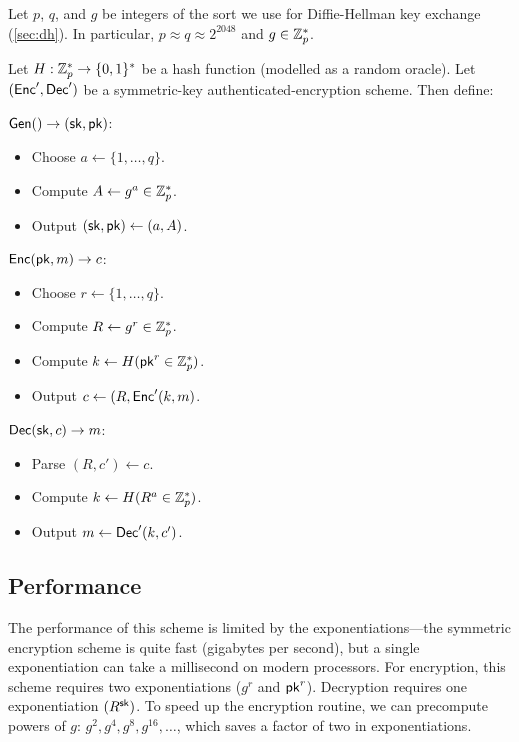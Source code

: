 \begin{definition}
Let $p$, $q$, and $g$ be integers of the sort we use for Diffie-Hellman
key exchange (\cref{sec:dh}).
In particular, $p \approx q \approx 2^{2048}$
and $g \in \mathbb{Z}^*_p$.

Let $H: \mathbb{Z}^*_p \rightarrow \{0,1\}^*$ be a hash function (modelled as a random oracle). Let $(\mathsf{Enc}', \mathsf{Dec}')$ 
be a symmetric-key authenticated-encryption scheme. Then define:

\begin{compactitem}
\item $\mathsf{Gen}() \to ({\mathsf{sk}}, \mathsf{pk})$:
    \begin{itemize}[noitemsep]
          \item Choose $a \gets \{1, \dots, q\}$.
          \item Compute $A \gets g^a \in \mathbb{Z}^*_p$.
          \item Output $({\mathsf{sk}}, \mathsf{pk}) \gets (a, A)$.	
    \end{itemize}
  \item $\mathsf{Enc}(\mathsf{pk}, m) \to c$:
    \begin{itemize}[noitemsep]
      \item Choose $r \gets \{1, \dots, q\}$.
      \item Compute $R \gets g^r \in \mathbb{Z}^*_p$.
      \item Compute $k \gets H(\mathsf{pk}^r \in \mathbb{Z}^*_p)$.
      \item Output $c \gets (R, \mathsf{Enc}'(k, m)$.
    \end{itemize}

  \item $\mathsf{Dec}({\mathsf{sk}}, c) \to m$:
    \begin{itemize}[noitemsep]
      \item Parse $(R, c') \gets c$.
      \item Compute $k \gets H(R^a \in \mathbb{Z}^*_p)$.
      \item Output $m \gets \mathsf{Dec}'(k, c')$.
    \end{itemize}
\end{compactitem}
\end{definition}

\subsection{Performance}
The performance of this scheme is limited by the exponentiations---the symmetric encryption scheme is quite fast (gigabytes per second), but a single exponentiation can take a millisecond on modern processors. For encryption, this scheme requires two exponentiations ($g^r$ and $\mathsf{pk}^r$). Decryption requires one exponentiation $(R^{\mathsf{sk}})$.
To speed up the encryption routine, we can precompute powers of $g$: $g^2, g^4, g^8, g^{16}, \dots$, which saves a factor of two in exponentiations.

